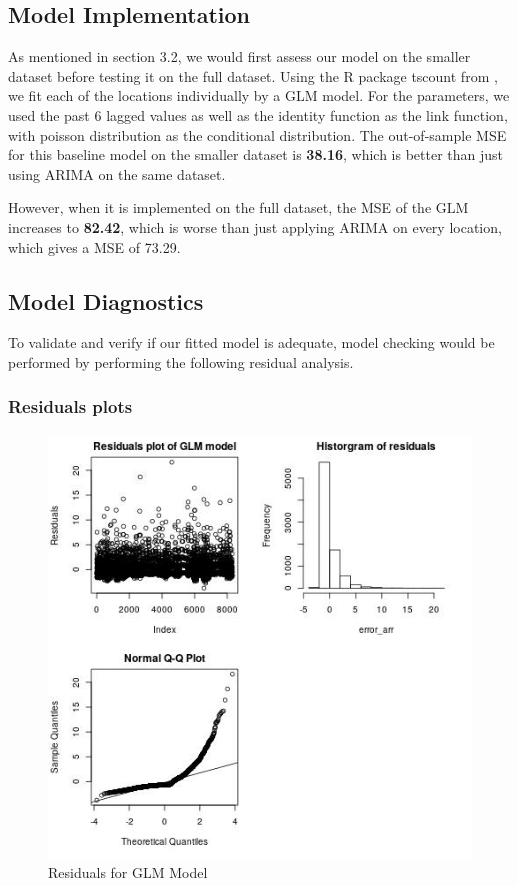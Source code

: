 \documentclass[12pt, letterpaper] {article}
\begin{document}

\subsection{Model Implementation}
\noindent As mentioned in section 3.2, we would first assess our model on the smaller dataset before testing it on the full dataset. Using the R package tscount from \cite{Tobias2017}, we fit each of the locations individually by a GLM model. For the parameters, we used the past 6 lagged values as well as the identity function as the link function, with poisson distribution as the conditional distribution. The out-of-sample MSE for this baseline model on the smaller dataset is \textbf{38.16}, which is better than just using ARIMA on the same dataset.  

\noindent However, when it is implemented on the full dataset, the MSE of the GLM increases to \textbf{82.42}, which is worse than just applying ARIMA on every location, which gives a MSE of 73.29. 

\subsection{Model Diagnostics}
To validate and verify if our fitted model is adequate, model checking would be performed by performing the following residual analysis.		

\subsubsection{Residuals plots}

\begin{figure}[H]
    \centering
    \includegraphics[width=\textwidth, height=0.7\textheight]{Images/Full_GLM_resids.jpg}
    \caption{Residuals for GLM Model}
    \label{fig:Residuals for GLM Model}
\end{figure}
\end{document}
